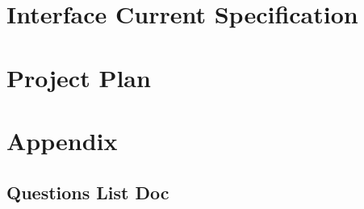 \documentclass[12pt,twoside]{article}
\begin{document}
\section{Interface Current Specification}



\clearpage
\section{Project Plan}

\clearpage
\section{Appendix}
\subsection{Questions List Doc}





\end{document}
